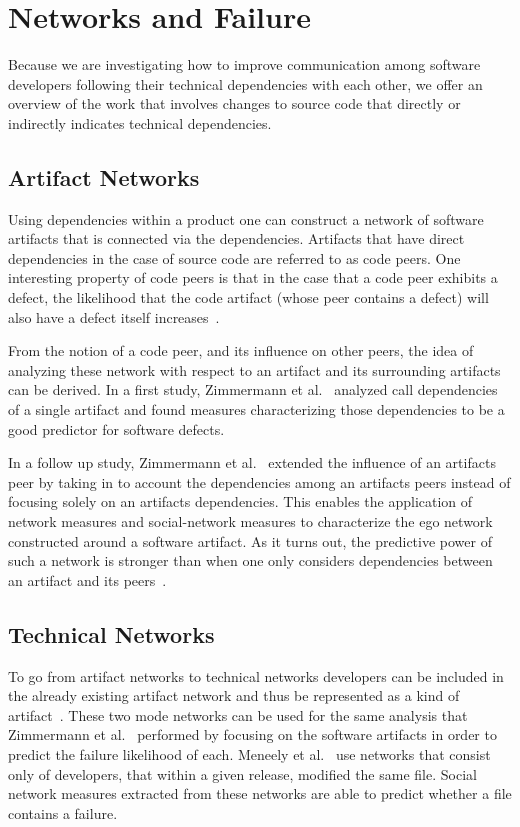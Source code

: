 \section{Networks and Failure}
Because we are investigating how to improve communication among software developers following their technical dependencies with each other, we offer an overview of the work that involves changes to source code that directly or indirectly indicates technical dependencies. 


\subsection{Artifact Networks}
\label{chap:6:an}
Using dependencies within a product one can construct a network of software artifacts that is connected via the dependencies.
Artifacts that have direct dependencies in the case of source code are referred to as code peers.
One interesting property of code peers is that in the case that a code peer exhibits a defect, the likelihood that the code artifact (whose peer contains a defect) will also have a defect itself increases~\cite{nguyen:icse:2010}.

From the notion of a code peer, and its influence on other peers, the idea of analyzing these network with respect to an artifact and its surrounding artifacts can be derived.
In a first study, Zimmermann et al.~\cite{zimmermann:icse:2008} analyzed call dependencies of a single artifact and found measures characterizing those dependencies to be a good predictor for software defects.

In a follow up study, Zimmermann et al.~\cite{zimmermann:esem:2009} extended the influence of an artifacts peer by taking in to account the dependencies among an artifacts peers instead of focusing solely on an artifacts dependencies.
This enables the application of network measures and social-network measures to characterize the ego network constructed around a software artifact.
As it turns out, the predictive power of such a network is stronger than when one only considers dependencies between an artifact and its peers~\cite{zimmermann:esem:2009}.

\subsection{Technical Networks}
\label{chap:6:tn}
To go from artifact networks to technical networks developers can be included in the already existing artifact network and thus be represented as a kind of artifact~\cite{pinzger:fse:2008}.
These two mode networks can be used for the same analysis that Zimmermann et al.~\cite{zimmermann:esem:2009,zimmermann:icse:2008} performed by focusing on the software artifacts in order to predict the failure likelihood of each.
%
Meneely et al.~\cite{meneely:fse:2008} use networks that consist only of developers, that within a given release, modified the same file.
Social network measures extracted from these networks are able to predict whether a file contains a failure.




